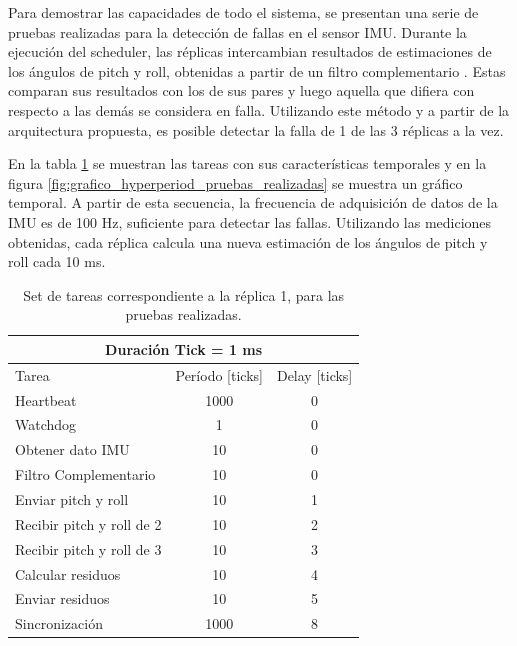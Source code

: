 Para demostrar las capacidades de todo el sistema, se presentan una serie de pruebas realizadas para la detección de fallas en el sensor IMU. Durante la ejecución del scheduler, las réplicas intercambian resultados de estimaciones de los ángulos de pitch y roll, obtenidas a partir de un filtro complementario \cite{Pose2014}. Estas comparan sus resultados con los de sus pares y luego aquella que difiera con respecto a las demás se considera en falla. Utilizando este método y a partir de la arquitectura propuesta, es posible detectar la falla %
de 1 de las 3 réplicas a la vez.

En la tabla \ref{tab:schedule_pruebas_realizadas} se muestran las tareas con sus características temporales y en la figura \ref{fig:grafico_hyperperiod_pruebas_realizadas} se muestra un gráfico temporal. A partir de esta secuencia, la frecuencia de adquisición de datos de la IMU es de 100 Hz, suficiente para detectar las fallas. Utilizando las mediciones obtenidas, cada réplica calcula una nueva estimación de los ángulos de pitch y roll cada 10 ms.

\begin{table}[H]
    \centering
    \begin{tabular}{|l|c|c|}
        \hline
        \multicolumn{3}{|c|}{Duración Tick = 1 ms}\\
        \hline
        Tarea & Período [ticks] & Delay [ticks]\\
        \hline
        Heartbeat                 & 1000 & 0 \\
        Watchdog                  & 1    & 0 \\ 
        Obtener dato IMU          & 10   & 0 \\
        Filtro Complementario     & 10   & 0 \\
        Enviar pitch y roll       & 10   & 1 \\
        Recibir pitch y roll de 2 & 10   & 2 \\
        Recibir pitch y roll de 3 & 10   & 3 \\
        Calcular residuos         & 10   & 4 \\
        Enviar residuos           & 10   & 5 \\
        Sincronización            & 1000 & 8 \\
        \hline
    \end{tabular}
    \caption{Set de tareas correspondiente a la réplica 1, para las pruebas realizadas.}
    \label{tab:schedule_pruebas_realizadas}
\end{table}

